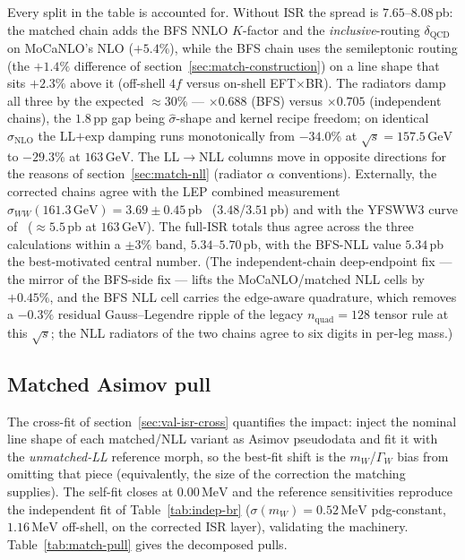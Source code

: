 \documentclass[11pt,a4paper]{article}
\newcommand{\mW}{m_W}
\newcommand{\GammaW}{\Gamma_W}
\newcommand{\sqrts}{\sqrt{s}}
\newcommand{\GeV}{\ensuremath{\,\mathrm{GeV}}}
\newcommand{\MeV}{\ensuremath{\,\mathrm{MeV}}}
\begin{document}
Every split in the table is accounted for. Without ISR the spread is
$7.65$--$8.08$\,pb: the matched chain adds the BFS NNLO $K$-factor and the
\emph{inclusive}-routing $\delta_\text{QCD}$ on MoCaNLO's NLO ($+5.4\%$), while
the BFS chain uses the semileptonic routing (the $+1.4\%$ difference of
section~\ref{sec:match-construction}) on a line shape that sits $+2.3\%$ above
it (off-shell $4f$ versus on-shell EFT$\times$BR). The radiators damp all three
by the expected ${\approx}30\%$ --- $\times0.688$ (BFS) versus $\times0.705$
(independent chains), the $1.8$\,pp gap being $\hat\sigma$-shape and kernel
recipe freedom; on identical $\hat\sigma_\text{NLO}$ the LL$+$exp damping runs
monotonically from $-34.0\%$ at $\sqrts=157.5\GeV$ to $-29.3\%$ at $163\GeV$.
The LL$\to$NLL columns move in opposite directions for the reasons of
section~\ref{sec:match-nll} (radiator $\alpha$ conventions). Externally, the
corrected chains agree with the LEP combined measurement
$\sigma_{WW}(161.3\GeV)=3.69\pm0.45$\,pb~\cite{LEP2EW} ($3.48$/$3.51$\,pb) and
with the YFSWW3 curve of~\cite{Azzurri2021} (${\approx}5.5$\,pb at $163\GeV$).
The full-ISR totals thus agree across the three calculations within a
${\pm}3\%$ band, $5.34$--$5.70$\,pb, with the BFS-NLL value $5.34$\,pb the
best-motivated central number. (The independent-chain deep-endpoint fix ---
the mirror of the BFS-side fix --- lifts the MoCaNLO/matched NLL cells by
$+0.45\%$, and the BFS NLL cell carries the edge-aware quadrature, which
removes a $-0.3\%$ residual Gauss--Legendre ripple of the legacy
$n_\text{quad}=128$ tensor rule at this $\sqrts$; the NLL radiators of the
two chains agree to six digits in per-leg mass.)

\subsection{Matched Asimov pull}\label{sec:match-pull}

The cross-fit of section~\ref{sec:val-isr-cross} quantifies the impact: inject the
nominal line shape of each matched/NLL variant as Asimov pseudodata and fit it with
the \emph{unmatched-LL} reference morph, so the best-fit shift is the $\mW$/$\GammaW$
bias from omitting that piece (equivalently, the size of the correction the matching
supplies). The self-fit closes at $0.00\MeV$ and the reference sensitivities
reproduce the independent fit of Table~\ref{tab:indep-br}
($\sigma(\mW)=0.52\MeV$ pdg-constant, $1.16\MeV$ off-shell, on the corrected ISR
layer), validating the machinery. Table~\ref{tab:match-pull} gives the
decomposed pulls.
\end{document}
